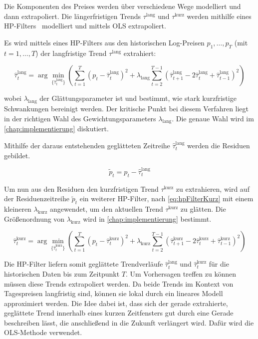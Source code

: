 Die Komponenten des Preises werden über verschiedene Wege modelliert und dann extrapoliert. Die längerfristigen Trends $\tau^\text{lang}$ und $\tau^\text{kurz}$ werden mithilfe eines \ac{HP}-Filters~\cite{hodrick1997postwar} modelliert und mittels \ac{OLS} extrapoliert.

Es wird mittels eines \ac{HP}-Filters aus den historischen Log-Preisen $p_1, \ldots, p_T$ (mit $t=1,\ldots,T$) der langfristige Trend $\tau^\text{lang}$ extrahiert:

\begin{equation}\label{eq:hpFilterLang}
    \hat{\tau}_t^\text{lang} = \arg\min_{\{\hat{\tau}_t^\text{lang}\}} \left(
    \sum_{t=1}^{T} (p_t - \hat{\tau}_t^\text{lang})^2
    + \lambda_\text{lang} \sum_{t=2}^{T-1} (\hat{\tau}_{t+1}^\text{lang} - 2\hat{\tau}_t^\text{lang} + \hat{\tau}_{t-1}^\text{lang})^2
    \right)
\end{equation}

wobei $\lambda_\text{lang}$ der Glättungsparameter ist und bestimmt, wie stark kurzfristige Schwankungen bereinigt werden. Der kritische Punkt bei diesem Verfahren liegt in der richtigen Wahl des Gewichtungsparameters $\lambda_\text{lang}$. Die genaue Wahl wird im \cref{chap:implementierung} diskutiert.

Mithilfe der daraus entstehenden geglätteten Zeitreihe $\hat{\tau}_t^\text{lang}$ werden die Residuen gebildet.

\[
    \tilde{p}_t = p_t - \hat{\tau}^{\text{lang}}_t
\]

Um nun aus den Residuen den kurzfristigen Trend $\tau^\text{kurz}$ zu extrahieren, wird auf der Residuenzeitreihe $\tilde{p}_t$ ein weiterer \ac{HP}-Filter, nach \cref{eq:hpFilterKurz} mit einem kleineren $\lambda_\text{kurz}$ angewendet, um den aktuellen Trend $\tau^{\text{kurz}}$ zu glätten. Die Größenordnung von $\lambda_\text{kurz}$ wird in \cref{chap:implementierung} bestimmt.

\begin{equation}\label{eq:hpFilterKurz}
    \hat{\tau}_t^\text{kurz} = \arg\min_{\{\hat{\tau}_t^\text{kurz}\}} \left(
    \sum_{t=1}^{T} (p_t - \hat{\tau}_t^\text{kurz})^2
    + \lambda_\text{kurz} \sum_{t=2}^{T-1} (\hat{\tau}_{t+1}^\text{kurz} - 2\hat{\tau}_t^\text{kurz} + \hat{\tau}_{t-1}^\text{kurz})^2
    \right)
\end{equation}

Die \ac{HP}-Filter liefern somit geglättete Trendverläufe $\hat{\tau}^{\text{lang}}_t$ und $\hat{\tau}^{\text{kurz}}_t$ für die historischen Daten bis zum Zeitpunkt $T$. Um Vorhersagen treffen zu können müssen diese Trends extrapoliert werden. Da beide Trends im Kontext von Tagespreisen langfristig sind, können sie lokal durch ein lineares Modell approximiert werden. Die Idee dabei ist, dass sich der gerade extrahierte, geglättete Trend innerhalb eines kurzen Zeitfensters gut durch eine Gerade beschreiben lässt, die anschließend in die Zukunft verlängert wird. Dafür wird die \ac{OLS}-Methode verwendet.

